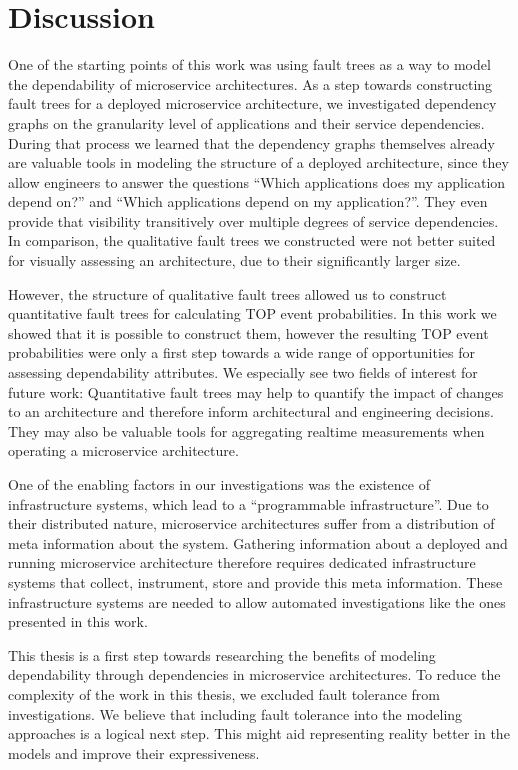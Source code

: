 
\chapter{Discussion}
\label{chapter:discussion}

One of the starting points of this work was using fault trees as a way to model the dependability of microservice architectures. As a step towards constructing fault trees for a deployed microservice architecture, we investigated dependency graphs on the granularity level of applications and their service dependencies. During that process we learned that the dependency graphs themselves already are valuable tools in modeling the structure of a deployed architecture, since they allow engineers to answer the questions ``Which applications does my application depend on?'' and ``Which applications depend on my application?''. They even provide that visibility transitively over multiple degrees of service dependencies. In comparison, the qualitative fault trees we constructed were not better suited for visually assessing an architecture, due to their significantly larger size.

However, the structure of qualitative fault trees allowed us to construct quantitative fault trees for calculating TOP event probabilities. In this work we showed that it is possible to construct them, however the resulting TOP event probabilities were only a first step towards a wide range of opportunities for assessing dependability attributes. We especially see two fields of interest for future work: Quantitative fault trees may help to quantify the impact of changes to an architecture and therefore inform architectural and engineering decisions. They may also be valuable tools for aggregating realtime measurements when operating a microservice architecture.

One of the enabling factors in our investigations was the existence of infrastructure systems, which lead to a ``programmable infrastructure''. Due to their distributed nature, microservice architectures suffer from a distribution of meta information about the system. Gathering information about a deployed and running microservice architecture therefore requires dedicated infrastructure systems that collect, instrument, store and provide this meta information. These infrastructure systems are needed to allow automated investigations like the ones presented in this work.

This thesis is a first step towards researching the benefits of modeling dependability through dependencies in microservice architectures. To reduce the complexity of the work in this thesis, we excluded fault tolerance from investigations. We believe that including fault tolerance into the modeling approaches is a logical next step. This might aid representing reality better in the models and improve their expressiveness.